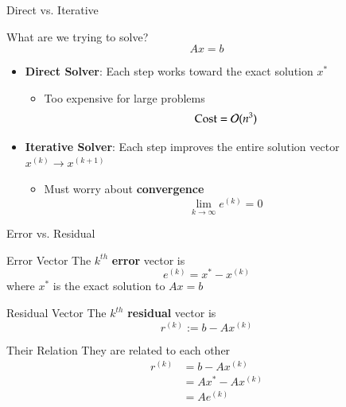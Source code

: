 \documentclass[10pt]{beamer}
\begin{document}
\begin{frame}{Direct vs. Iterative}

\begin{block}{What are we trying to solve?}
$$Ax=b$$
\end{block}

\begin{itemize}
    \item \textbf{Direct Solver}:  Each step works toward the exact solution $x^*$
    \begin{itemize}
        \item Too expensive for large problems 
        $$
        \text{Cost} = {\mathcal{O}}(n^3)
        $$
    \end{itemize}
    \vfill
    \item \textbf{Iterative Solver}: Each step improves the entire solution vector $x^{(k)}\to x^{(k+1)}$
        \begin{itemize}
            \item Must worry about \textbf{convergence}
             $$\lim_{k\to\infty} e^{(k)}=0$$
        \end{itemize}
    \vfill
\end{itemize}
    
\end{frame}


\begin{frame}{Error vs. Residual}


    \begin{block}{Error Vector}
     The $k^{th}$ \textbf{error} vector is 
    $$
    e^{(k)} = x^*-x^{(k)}
    $$
    where $x^*$ is the exact solution to $Ax=b$
    \end{block}
    \vfill 

    \begin{block}{Residual Vector}
    The $k^{th}$ \textbf{residual} vector is 
        $$ r^{(k)} := b - Ax^{(k)}$$
    \end{block}
    \vfill

    \begin{block}{Their Relation}    
    They are related to each other
        \begin{align*}
        r^{(k)} &= b - Ax^{(k)}\\
        &= Ax^{*} - A x^{(k)}\\
        &=A e^{(k)}
        \end{align*}
    \end{block}


\end{frame}
\end{document}
